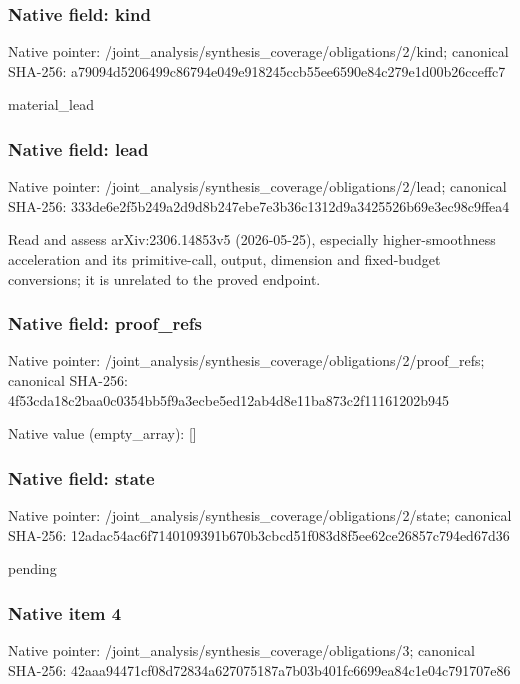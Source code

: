 \documentclass[10pt,a4paper]{article}
\begin{document}
\subsubsection{Native field: kind}
Native pointer: /joint\_\allowbreak{}analysis/synthesis\_\allowbreak{}coverage/obligations/2/kind; canonical SHA-256: a79094d5206499c86794e049e918245ccb55ee6590e84c279e1d00b26cceffc7

\begingroup\raggedright\sloppy material\_\allowbreak{}lead\par\endgroup

\subsubsection{Native field: lead}
Native pointer: /joint\_\allowbreak{}analysis/synthesis\_\allowbreak{}coverage/obligations/2/lead; canonical SHA-256: 333de6e2f5b249a2d9d8b247ebe7e3b36c1312d9a3425526b69e3ec98c9ffea4

\begingroup\raggedright\sloppy Read and assess arXiv:\allowbreak{}2306.14853v5 (2026-05-25),\allowbreak{} especially higher-smoothness acceleration and its primitive-call,\allowbreak{} output,\allowbreak{} dimension and fixed-budget conversions;\allowbreak{} it is unrelated to the proved endpoint.\par\endgroup

\subsubsection{Native field: proof\_\allowbreak{}refs}
Native pointer: /joint\_\allowbreak{}analysis/synthesis\_\allowbreak{}coverage/obligations/2/proof\_\allowbreak{}refs; canonical SHA-256: 4f53cda18c2baa0c0354bb5f9a3ecbe5ed12ab4d8e11ba873c2f11161202b945

Native value (empty\_\allowbreak{}array): []

\subsubsection{Native field: state}
Native pointer: /joint\_\allowbreak{}analysis/synthesis\_\allowbreak{}coverage/obligations/2/state; canonical SHA-256: 12adac54ac6f7140109391b670b3cbcd51f083d8f5ee62ce26857c794ed67d36

\begingroup\raggedright\sloppy pending\par\endgroup

\subsubsection{Native item 4}
Native pointer: /joint\_\allowbreak{}analysis/synthesis\_\allowbreak{}coverage/obligations/3; canonical SHA-256: 42aaa94471cf08d72834a627075187a7b03b401fc6699ea84c1e04c791707e86
\end{document}
